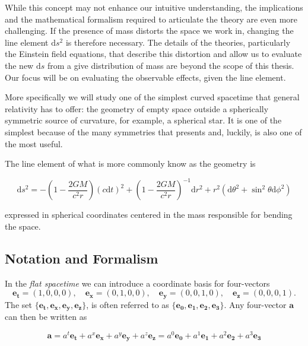 While this concept may not enhance our intuitive understanding, the
implications and the mathematical formalism required to articulate the theory
are even more challenging.
If the presence of mass distorts the space we work in, changing the line
element $\mathrm{d}s^2$ is therefore necessary.
The details of the theories, particularly the Einstein field equations, that
describe this distortion and allow us to evaluate the new $\mathrm{d}s$ from a
give distribution of mass are beyond the scope of this thesis.
Our focus will be on evaluating the observable effects, given the line
element.

More specifically we will study one of the simplest curved spacetime that
general relativity has to offer: the geometry of empty space outside a
spherically symmetric source of curvature, for example, a spherical
star.
It is one of the simplest because of the many symmetries that presents and,
luckily, is also one of the most useful.

The line element of what is more commonly know as the \Sh geometry is

\begin{equation*}
    \mathrm{d}s^2 = - \left(1 - \frac{2 G M}{c^2 r} \right) (c \mathrm{d}t)^2
    + \left(1 - \frac{2 G M}{c^2 r} \right)^{-1} \mathrm{d}r^2
    + r^2 (\mathrm{d}\theta^2 + \sin^2 \theta \mathrm{d}\phi^2)
\end{equation*}

expressed in spherical coordinates centered in the mass responsible for bending
the space.

\newpage


\subsection{Notation and Formalism} \label{ssec:notation}

In the \textit{flat spacetime} we can introduce a coordinate basis for
four-vectors
\begin{equation}
    \mathbf{e_t} = (1,0,0,0), \quad
    \mathbf{e_x} = (0,1,0,0), \quad
    \mathbf{e_y} = (0,0,1,0), \quad
    \mathbf{e_z} = (0,0,0,1).
    \label{eq:coord_base}
\end{equation}
The set 
$\{ \mathbf{e_t}, \mathbf{e_x}, \mathbf{e_y}, \mathbf{e_z} \}$, is often
referred to as $\{ \mathbf{e_0}, \mathbf{e_1}, \mathbf{e_2}, \mathbf{e_3} \}$.
Any four-vector $\textbf{a}$ can then be written as

\begin{equation}
    \textbf{a}
    = a^t \mathbf{e_t} + a^x \mathbf{e_x} + a^y \mathbf{e_y} + a^z \mathbf{e_z}
    = a^0 \mathbf{e_0} + a^1 \mathbf{e_1} + a^2 \mathbf{e_2} + a^3 \mathbf{e_3}
    \label{eq:a}
\end{equation}

